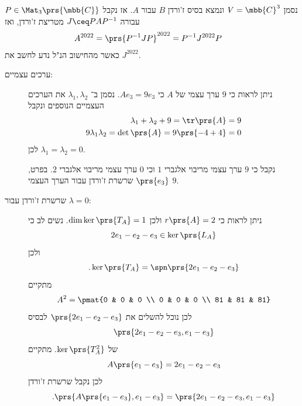 \documentclass[a4paper,10pt,twoside,openany]{book}
\begin{document}
\begin{solution}
נסמן
$V = \mbb{C}^3$
ונמצא בסיס ז'ורדן
$B$
עבור
$A$.
אז נקבל
$P \in \Mat_3\prs{\mbb{C}}$
עבורה
$J \ceq P A P^{-1}$
מטריצת ז'ורדן, ואז
\begin{align*}
A^{2022} &= \prs{P^{-1}JP}^{2022}
= P^{-1}J^{2022}P
\end{align*}
כאשר מהחישוב הנ"ל נדע לחשב את
$J^{2022}$.

\begin{description}
\item[ערכים עצמיים:]
ניתן לראות כי
$9$
ערך עצמי של
$A$
כי
$A e_3 = 9 e_3$.
נסמן ב־%
$\lambda_1, \lambda_2$
את הערכים העצמיים הנוספים ונקבל
\begin{align*}
\lambda_1 + \lambda_2 + 9 = \tr\prs{A} = 9 \\
9 \lambda_1 \lambda_2 = \det\prs{A} = 9\prs{-4+4} = 0
\end{align*}
לכן
$\lambda_1 = \lambda_2 = 0$.

נקבל כי
$9$
ערך עצמי מריבוי אלגברי
$1$
וכי
$0$
ערך עצמי מריבוי אלגברי
$2$.
בפרט,
$\prs{e_3}$
שרשרת ז'ורדן עבור הערך העצמי
$9$.
\item[שרשרת ז'ורדן עבור
$\lambda = 0$:]
ניתן לראות כי
$r\prs{A} = 2$
ולכן
$\dim \ker \prs{T_A} = 1$.
נשים לב כי
\[2 e_1 - e_2 - e_3 \in \ker\prs{L_A}\]
ולכן
\[\text{.} \ker\prs{T_A} = \spn\prs{2 e_1 - e_2 - e_3}\]
מתקיים
\[A^2 = \pmat{0 & 0 & 0 \\ 0 & 0 & 0 \\ 81 & 81 & 81}\]
לכן נוכל להשלים את
$\prs{2 e_1 - e_2 - e_3}$
לבסיס
\[\prs{2 e_1 - e_2 - e_3, e_1 - e_3}\]
של
$\ker\prs{T_A^2}$.
מתקיים
\[A \prs{e_1 - e_3} = 2e_1 - e_2 - e_3\]
לכן נקבל שרשרת ז'ורדן
\[\text{.} \prs{A\prs{e_1 - e_3}, e_1 - e_3} = \prs{2e_1 - e_2 - e_3, e_1 - e_3}\]


\end{description}
\end{solution}
\end{document}
